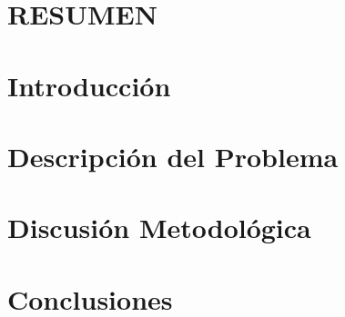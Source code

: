 \documentclass[pdftex,spanish]{pucthesis}	%
\begin{document}

\tableofcontents
{} \label{listoffigures}
\listoffigures
{} \label{listoftables}
\listoftables
\cleardoublepage



 \label{resumen}
\chapter*{RESUMEN}

\cleardoublepage



\chapter[INTRODUCCI\'ON]{Introducci\'on}


\chapter[DESCRIPCI\'ON DEL PROBLEMA]{Descripci\'on del Problema} \label{ch:problema}


\chapter[DISCUSI\'ON METODOL\'OGICA]{Discusi\'on Metodol\'ogica} \label{ch:metodologia}


\chapter[CONCLUSIONES]{Conclusiones}



\cleardoublepage
{} \label{references}

\renewcommand{\bibname}{BIBLIOGRAF\'IA}
\end{document}
